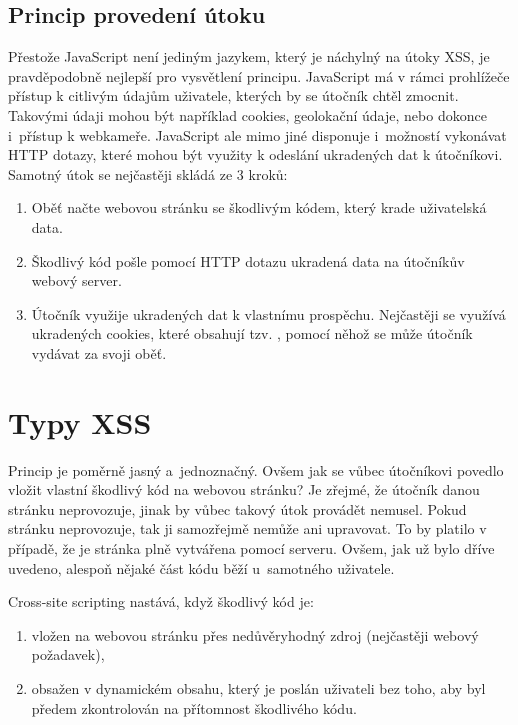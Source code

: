 \documentclass[11pt, conference, a4paper]{IEEEtran}
\begin{document}
\subsection{Princip provedení útoku}
Přestože JavaScript není jediným jazykem, který je náchylný na útoky XSS, je pravděpodobně nejlepší pro vysvětlení principu. JavaScript má v rámci prohlížeče přístup k citlivým údajům uživatele, kterých by se útočník chtěl zmocnit. Takovými údaji mohou být například cookies, geolokační údaje, nebo dokonce i~přístup k webkameře. JavaScript ale mimo jiné disponuje i~možností vykonávat HTTP dotazy, které mohou být využity k odeslání ukradených dat k útočníkovi. Samotný útok se nejčastěji skládá ze 3 kroků:
\begin{enumerate}
    \item Oběť načte webovou stránku se škodlivým kódem, který krade uživatelská data.
    
    \item Škodlivý kód pošle pomocí HTTP dotazu ukradená data na útočníkův webový server.

    \item Útočník využije ukradených dat k vlastnímu prospěchu. Nejčastěji se využívá ukradených cookies, které obsahují tzv. , pomocí něhož se může útočník vydávat za svoji oběť.~\cite{XSS-cloudflare}
    
\end{enumerate}

\section{Typy XSS}
Princip je poměrně jasný a~jednoznačný. Ovšem jak se vůbec útočníkovi povedlo vložit vlastní škodlivý kód na webovou stránku? Je zřejmé, že útočník danou stránku neprovozuje, jinak by vůbec takový útok provádět nemusel. Pokud stránku neprovozuje, tak ji samozřejmě nemůže ani upravovat. To by platilo v případě, že je stránka plně vytvářena pomocí serveru. Ovšem, jak už bylo dříve uvedeno, alespoň nějaké část kódu běží u~samotného uživatele. 

Cross-site scripting nastává, když škodlivý kód je:
\begin{enumerate}
    \item vložen na webovou stránku přes nedůvěryhodný zdroj (nejčastěji webový požadavek),
    \item obsažen v dynamickém obsahu, který je poslán uživateli bez toho, aby byl předem zkontrolován na přítomnost škodlivého kódu.
\end{enumerate}
\end{document}
